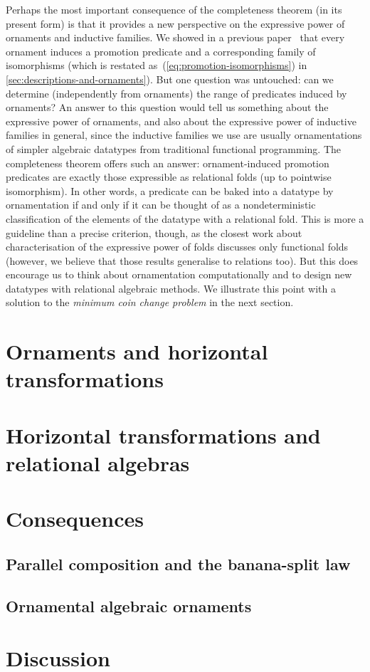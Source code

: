Perhaps the most important consequence of the completeness theorem (in its present form) is that it provides a new perspective on the expressive power of ornaments and inductive families.
We showed in a previous paper~\cite{Ko-pcOrn} that every ornament induces a promotion predicate and a corresponding family of isomorphisms (which is restated as~(\ref{eq:promotion-isomorphisms}) in \autoref{sec:descriptions-and-ornaments}).
But one question was untouched: can we determine (independently from ornaments) the range of predicates induced by ornaments?
An answer to this question would tell us something about the expressive power of ornaments, and also about the expressive power of inductive families in general, since the inductive families we use are usually ornamentations of simpler algebraic datatypes from traditional functional programming.
The completeness theorem offers such an answer: ornament-induced promotion predicates are exactly those expressible as relational folds (up to pointwise isomorphism).
In other words, a predicate can be baked into a datatype by ornamentation if and only if it can be thought of as a nondeterministic classification of the elements of the datatype with a relational fold.
This is more a guideline than a precise criterion, though, as the closest work about characterisation of the expressive power of folds discusses only functional folds~\cite{Gibbons-kernels}
(however, we believe that those results generalise to relations too).
But this does encourage us to think about ornamentation computationally and to design new datatypes with relational algebraic methods.
We illustrate this point with a solution to the \emph{minimum coin change problem} in the next section.

\section{Ornaments and horizontal transformations}

\section{Horizontal transformations and relational algebras}

\section{Consequences}

\subsection{Parallel composition and the banana-split law}


\subsection{Ornamental algebraic ornaments}

\section{Discussion}

